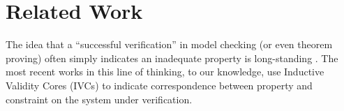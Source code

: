 \documentclass{svjour3}
\begin{document}

\section{Related Work}

The idea that a ``successful verification'' in model checking (or even
 theorem proving) often simply indicates an inadequate property is
long-standing \cite{PracticalCov,Hoskote}. The most recent works in
this line of thinking, to our knowledge, use Inductive Validity Cores
(IVCs) \cite{WhalenIVC1,WhalenIVC2,WhalenIVC3} to indicate correspondence between property
and constraint on the system under verification.
\end{document}
